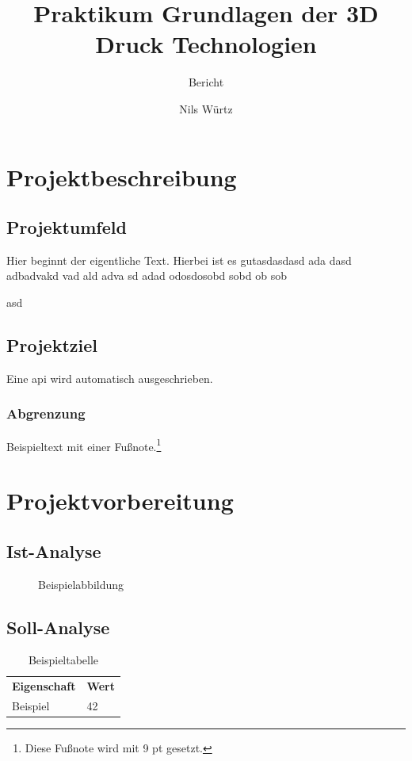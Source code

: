 \documentclass[11pt]{template}
\title{Praktikum Grundlagen der 3D Druck Technologien}
\subtitle{Bericht}
\author{Nils Würtz}
\begin{document}
\maketitle
\makefrontmatter

\chapter{Projektbeschreibung}

\section{Projektumfeld}
Hier beginnt der eigentliche Text.
Hierbei ist es gutasdasdasd ada dasd adbadvakd vad ald adva sd adad odosdosobd sobd ob sob

asd

\section{Projektziel}
Eine \ac{api} wird automatisch ausgeschrieben.

\subsection{Abgrenzung}
Beispieltext mit einer Fußnote.\footnote{Diese Fußnote wird mit 9 pt gesetzt.}

\chapter{Projektvorbereitung}

\section{Ist-Analyse}

\begin{figure}[H]
  \centering
  \caption{Beispielabbildung}
  \fbox{\rule{0pt}{3cm}\rule{5cm}{0pt}}
  \label{fig:example}
\end{figure}

\section{Soll-Analyse}

\begin{table}[H]
  \centering
  \caption{Beispieltabelle}
  \begin{tabular}{ll}
    \textbf{Eigenschaft} & \textbf{Wert} \\
    Beispiel             & 42
  \end{tabular}
  \label{tab:example}
\end{table}
\end{document}
